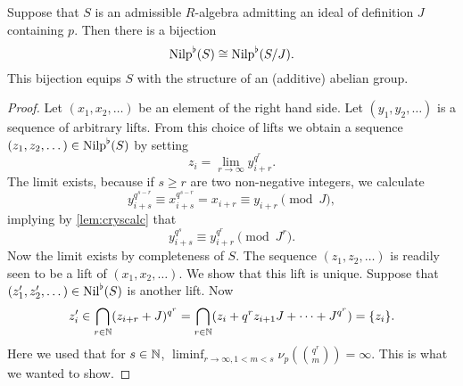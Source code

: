 \documentclass[../main.tex]{subfiles}
\begin{document}
\begin{lem} \label{lem:crysnilp}
  Suppose that $S$ is an admissible $R$-algebra admitting an ideal of
  definition $J$ containing $p$. Then there is a bijection
  \begin{equation*}
    {\mathrm{Nilp}}^\flat(S) \cong {\mathrm{Nilp}}^\flat(S/J).
  \end{equation*}
  This bijection equips $S$ with the structure of an (additive) abelian group. 
  \begin{proof}[Proof]
    Let $(x_1, x_2, \dots)$ be an element of the right hand side. Let
    $(y_1, y_2, \dots)$ is a sequence of arbitrary lifts. From this choice of lifts
    we obtain a sequence
    $(z_1, z_2, \dots) \in {\mathrm{Nilp}}^\flat(S)$ by setting
    \begin{equation*}
      z_i = \lim_{r \to \infty} y_{i+r}^{q^r}.
    \end{equation*}
    The limit exists, because if $s \geq r$ are two non-negative integers, we calculate
    \begin{equation*}
      y_{i + s}^{q^{s-r}} \equiv x_{i+s}^{q^{s-r}} = x_{i+r} \equiv y_{i+r} \pmod J,
    \end{equation*}
    implying by \ref{lem:cryscalc} that 
    \begin{equation*}
      y_{i+s}^{q^s} \equiv y_{i+r}^{q^r} \pmod {J^r}.
    \end{equation*}
    Now the limit exists by completeness of $S$.
    The sequence $(z_1, z_2, \dots)$  is readily seen to be a lift of 
    $(x_1, x_2, \dots)$. We show that this lift is unique. Suppose that 
    $(z'_1, z'_2, \dots) \in {\operatorname{Nil}}^\flat(S)$ is another lift. Now 
    \begin{equation*}
      z'_i \in \bigcap_{r \in \mathbb{N}}(z_{i+r} + J)^{q^r} = \bigcap_{r \in \mathbb{N}}(z_{i} +
      q^r z_{i+1} J + \dots + J^{q^r})=  \{z_i\}.
    \end{equation*}
  Here we used that for $s \in \mathbb{N}$, $\liminf_{r \to \infty, 1<m<s} \nu_p\left( \binom
    {q^r}{m} \right) = \infty$. This is what we wanted to show.
  \end{proof}
\end{lem}
\end{document}
